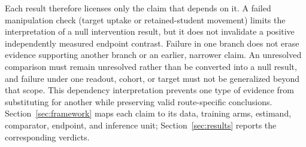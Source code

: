 Each result therefore licenses only the claim that depends on it.
A failed manipulation check (target uptake or retained-student movement) limits the interpretation of a null intervention result, but it does not invalidate a positive independently measured endpoint contrast.
Failure in one branch does not erase evidence supporting another branch or an earlier, narrower claim.
An unresolved comparison must remain unresolved rather than be converted into a null result, and failure under one readout, cohort, or target must not be generalized beyond that scope.
This dependency interpretation prevents one type of evidence from substituting for another while preserving valid route-specific conclusions.
Section~\ref{sec:framework} maps each claim to its data, training arms, estimand, comparator, endpoint, and inference unit; Section~\ref{sec:results} reports the corresponding verdicts.
